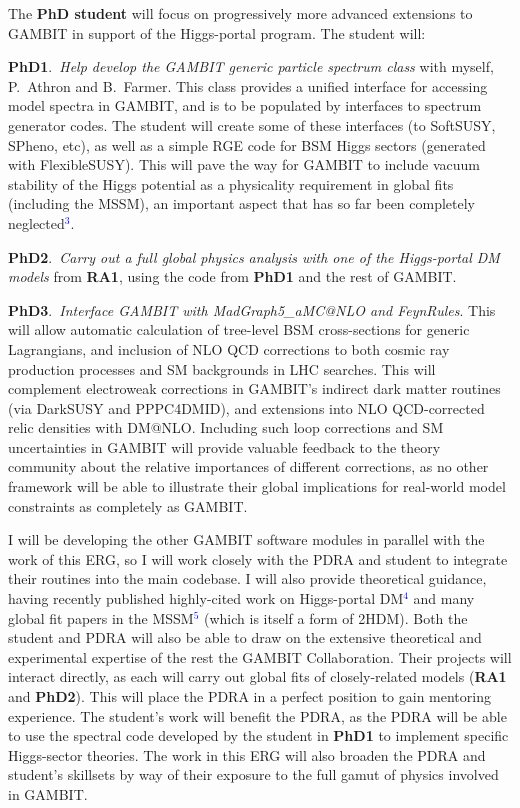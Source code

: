 \documentclass[11pt,oneside,twocolumn,a4paper]{article}
\begin{document}
The \textbf{PhD student} will focus on progressively more advanced extensions to GAMBIT in support of the Higgs-portal program.  The student will:

\textbf{PhD1}.\ \textit{Help develop the GAMBIT generic particle spectrum class} with myself, P.\ Athron and B.\ Farmer.  This class provides a unified interface for accessing model spectra in GAMBIT, and is to be populated by interfaces to spectrum generator codes.  The student will create some of these interfaces (to SoftSUSY, SPheno, etc), as well as a simple RGE code for BSM Higgs sectors (generated with FlexibleSUSY).  This will pave the way for GAMBIT to include vacuum stability of the Higgs potential as a physicality requirement in global fits (including the MSSM), an important aspect that has so far been completely neglected\textcolor{blue}{$^{3}$}.  

\textbf{PhD2}.\ \textit{Carry out a full global physics analysis with one of the Higgs-portal DM models} from \textbf{RA1}, using the code from \textbf{PhD1} and the rest of GAMBIT.

\textbf{PhD3}.\ \textit{Interface GAMBIT with MadGraph5\_aMC@NLO and FeynRules}.  This will allow automatic calculation of tree-level BSM cross-sections for generic Lagrangians, and inclusion of NLO QCD corrections to both cosmic ray production processes and SM backgrounds in LHC searches.  This will complement electroweak corrections in GAMBIT's indirect dark matter routines (via DarkSUSY and PPPC4DMID), and extensions into NLO QCD-corrected relic densities with DM@NLO.  Including such loop corrections and SM uncertainties in GAMBIT will provide valuable feedback to the theory community about the relative importances of different corrections, as no other framework will be able to illustrate their global implications for real-world model constraints as completely as GAMBIT.

I will be developing the other GAMBIT software modules in parallel with the work of this ERG, so I will work closely with the PDRA and student to integrate their routines into the main codebase.  I will also provide theoretical guidance, having recently published highly-cited work on Higgs-portal DM\textcolor{blue}{$^4$} and many global fit papers in the MSSM\textcolor{blue}{$^5$} (which is itself a form of 2HDM).  Both the student and PDRA will also be able to draw on the extensive theoretical and experimental expertise of the rest the GAMBIT Collaboration.  Their projects will interact directly, as each will carry out global fits of closely-related models (\textbf{RA1} and \textbf{PhD2}).  This will place the PDRA in a perfect position to gain mentoring experience.  The student's work will benefit the PDRA, as the PDRA will be able to use the spectral code developed by the student in \textbf{PhD1} to implement specific Higgs-sector theories.  The work in this ERG will also broaden the PDRA and student's skillsets by way of their exposure to the full gamut of physics involved in GAMBIT.
\end{document}
